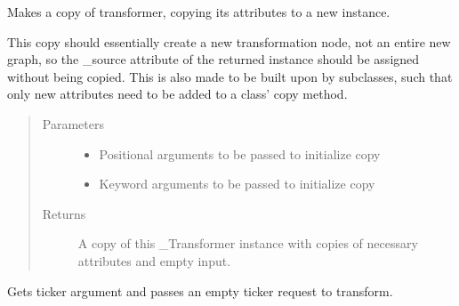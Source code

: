 \documentclass[letterpaper,10pt,english]{sphinxmanual}
\begin{document}
\begin{fulllineitems}
\begin{fulllineitems}
\label{\detokenize{dalio.pipe:dalio.pipe.StockComps.copy}}
Makes a copy of transformer, copying its attributes to a new
instance.

This copy should essentially create a new transformation node, not an
entire new graph, so the \_source attribute of the returned instance
should be assigned without being copied. This is also made to be built
upon by subclasses, such that only new attributes need to be added to
a class’ copy method.
\begin{quote}\begin{description}
\item[{Parameters}] \leavevmode\begin{itemize}
\item {} 
 \textendash{} Positional arguments to be passed to initialize copy

\item {} 
 \textendash{} Keyword arguments to be passed to initialize copy

\end{itemize}

\item[{Returns}] \leavevmode
A copy of this \_Transformer instance with copies of necessary
attributes and empty input.

\end{description}\end{quote}

\end{fulllineitems}


\begin{fulllineitems}
\end{fulllineitems}


\begin{fulllineitems}
\label{\detokenize{dalio.pipe:dalio.pipe.StockComps.run}}
Gets ticker argument and passes an empty ticker request to
transform.


\end{fulllineitems}
\end{fulllineitems}
\end{document}
